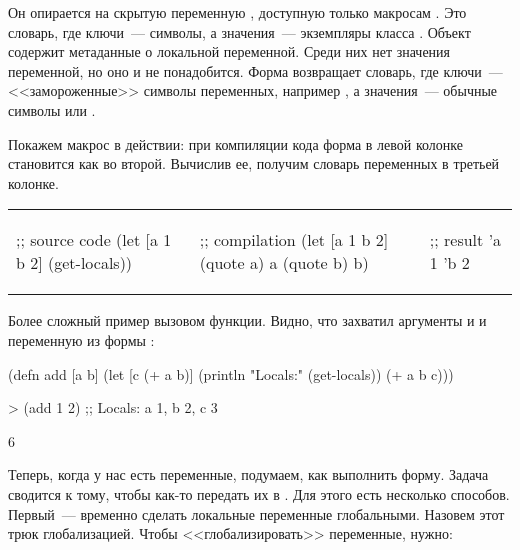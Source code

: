 Он опирается на скрытую переменную , доступную только макросам . Это словарь, где ключи~--- символы, а значения~--- экземпляры класса . Объект  содержит метаданные о локальной переменной. Среди них нет значения переменной, но оно и не понадобится. Форма  возвращает словарь, где ключи~--- <<замороженные>> символы переменных, например , а значения~--- обычные символы  или .

Покажем макрос в действии: при компиляции кода форма в левой колонке становится как во второй. Вычислив ее, получим словарь переменных в третьей колонке.

\begin{english}
\noindent
\begin{tabular}{ @{}p{4cm} @{}p{4cm} @{}p{3cm} }

  \begin{clojure}
;; source code
(let [a 1
      b 2]
  (get-locals))
  \end{clojure}

&

  \begin{clojure}
;; compilation
(let [a 1
      b 2]
  {(quote a) a
   (quote b) b})
  \end{clojure}

&

  \begin{clojure}
;; result
{'a 1 'b 2}
  \end{clojure}

\end{tabular}
\end{english}

Более сложный пример вызовом функции. Видно, что  захватил аргументы  и  и переменную  из формы :

\begin{english}
  \begin{clojure}
(defn add
  [a b]
  (let [c (+ a b)]
    (println "Locals:" (get-locals))
    (+ a b c)))

> (add 1 2)
;; Locals: {a 1, b 2, c 3}

6
  \end{clojure}
\end{english}

Теперь, когда у нас есть переменные, подумаем, как выполнить форму. Задача сводится к тому, чтобы как-то передать их в . Для этого есть несколько способов. Первый~--- временно сделать локальные переменные глобальными. Назовем этот трюк глобализацией. Чтобы <<глобализировать>> переменные, нужно:

